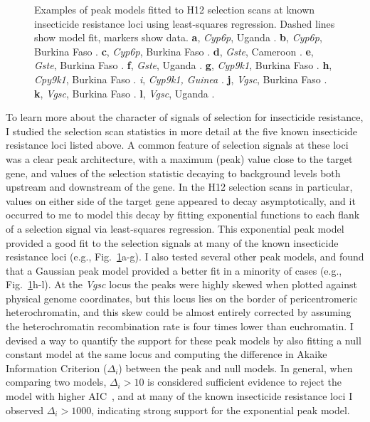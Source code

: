 \documentclass[a4paper,11pt,abstracton,hidelinks]{scrartcl}
\begin{document}
\begin{figure}[t!]
\begin{subfigure}[t]{0.32\textwidth}
    \end{subfigure}
    \caption{Examples of peak models fitted to H12 selection scans at known insecticide resistance loci using least-squares regression. Dashed lines show model fit, markers show data. \textbf{a}, \textit{Cyp6p}, Uganda \agam. \textbf{b}, \textit{Cyp6p}, Burkina Faso \agam. \textbf{c}, \textit{Cyp6p}, Burkina Faso \acol. \textbf{d}, \textit{Gste}, Cameroon \agam. \textbf{e}, \textit{Gste}, Burkina Faso \agam. \textbf{f}, \textit{Gste}, Uganda \agam. \textbf{g}, \textit{Cyp9k1}, Burkina Faso \agam. \textbf{h}, \textit{Cpy9k1}, Burkina Faso \acol. \textit{i}, \textit{Cyp9k1, Guinea \agam}. \textbf{j}, \textit{Vgsc}, Burkina Faso \acol. \textbf{k}, \textit{Vgsc}, Burkina Faso \agam. \textbf{l}, \textit{Vgsc}, Uganda \agam.}
    \label{fig:peak_fits}
\end{figure}


To learn more about the character of signals of selection for insecticide resistance, I studied the selection scan statistics in more detail at the five known insecticide resistance loci listed above.
%
A common feature of selection signals at these loci was a clear peak architecture, with a maximum (peak) value close to the target gene, and values of the selection statistic decaying to background levels both upstream and downstream of the gene.
%
In the H12 selection scans in particular, values on either side of the target gene appeared to decay asymptotically, and it occurred to me to model this decay by fitting exponential functions to each flank of a selection signal via least-squares regression.
%
This exponential peak model provided a good fit to the selection signals at many of the known insecticide resistance loci (e.g., Fig.~\ref{fig:peak_fits}a-g).
%
I also tested several other peak models, and found that a Gaussian peak model provided a better fit in a minority of cases (e.g., Fig.~\ref{fig:peak_fits}h-l).
%
At the \textit{Vgsc} locus the peaks were highly skewed when plotted against physical genome coordinates, but this locus lies on the border of pericentromeric heterochromatin, and this skew could be almost entirely corrected by assuming the heterochromatin recombination rate is four times lower than euchromatin.
%
I devised a way to quantify the support for these peak models by also fitting a null constant model at the same locus and computing the difference in Akaike Information Criterion ($\Delta_i$) between the peak and null models.
%
In general, when comparing two models, $\Delta_i > 10$ is considered sufficient evidence to reject the model with higher AIC~\parencite{Burnham2002}, and at many of the known insecticide resistance loci I observed $\Delta_i > 1000$, indicating strong support for the exponential peak model.
%
\end{document}
